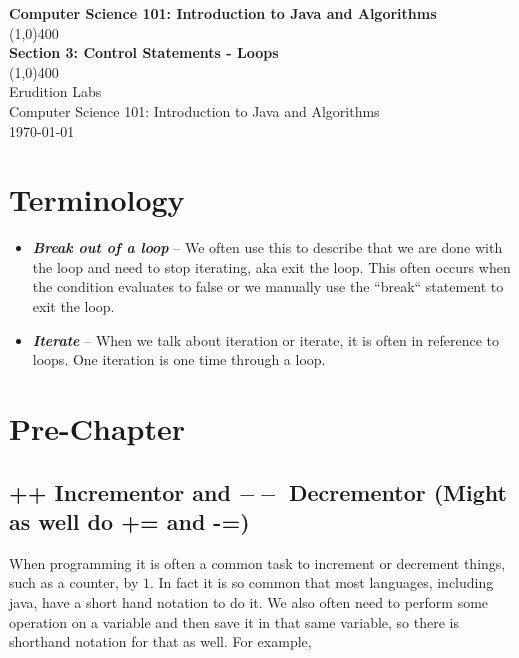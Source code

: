 \documentclass[11]{article}
\begin{document}
\begin{titlepage}
\begin{center}
\vspace{1cm}
\Large{\textbf{Computer Science 101: Introduction to Java and Algorithms}}\\
\vfill
\line(1,0){400}\\
\huge{\textbf{Section 3: Control Statements - Loops}}\\
\line(1,0){400}\\
\vfill
Erudition Labs\\
Computer Science 101: Introduction to Java and Algorithms\\
\today\\
\end{center}
\end{titlepage}

\tableofcontents
\thispagestyle{empty}
\clearpage
\setcounter{page}{1}

\section{Terminology}
\begin{itemize}
  \item \textbf{\textit{Break out of a loop}} --
  We often use this to describe that we are done with the loop and need to stop iterating, aka exit the loop. This often occurs when the condition evaluates to false or we manually use the ``break`` statement to exit the loop.
  
    \item \textbf{\textit{Iterate}} --
 When we talk about iteration or iterate, it is often in reference to loops.  One iteration is one time through a loop.
 
\end{itemize}

\section{Pre-Chapter}
\subsection{++ Incrementor and $--$ Decrementor (Might as well do += and -=)}
When programming it is often a common task to increment or decrement things, such as a counter, by $1$. In fact it is so common that most languages, including java, have a short hand notation to do it. We also often need to perform some operation on a variable and then save it in that same variable, so there is shorthand notation for that as well. For example,
\end{document}
